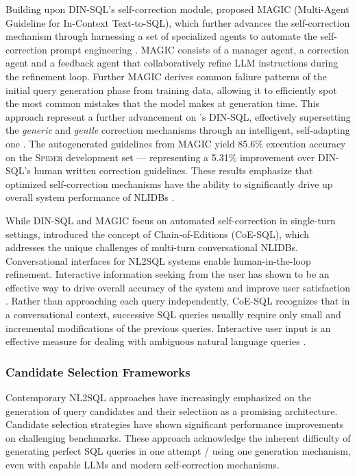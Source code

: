 \documentclass{article}
\begin{document}
Building upon DIN-SQL's self-correction module, \cite{MAGIC} proposed MAGIC (Multi-Agent Guideline for In-Context Text-to-SQL),
which further advances the self-correction mechanism through harnessing a set of specialized agents to automate the self-correction
prompt engineering \citep{MAGIC}. MAGIC consists of a manager agent, a correction agent and a feedback agent that collaboratively
refine LLM instructions during the refinement loop. Further MAGIC derives common faliure patterns of the initial query generation
phase from training data, allowing it to efficiently spot the most common mistakes that the model makes at generation time. This
approach represent a further advancement on \citeauthor{DINSQL}'s DIN-SQL, effectively supersetting the \textit{generic} and
\textit{gentle} correction mechanisms through an intelligent, self-adapting one \citep{MAGIC}. The autogenerated guidelines from
MAGIC yield 85.6\% execution accuracy on the \textsc{Spider} development set — representing a 5.31\% improvement over DIN-SQL's
human written correction guidelines. These results emphasize that optimized self-correction mechanisms have the ability to
significantly drive up overall system performance of NLIDBs \citep{MAGIC}.

While DIN-SQL and MAGIC focus on automated self-correction in single-turn settings, \cite{CoE-SQL} introduced the concept of
Chain-of-Editions (CoE-SQL), which addresses the unique challenges of multi-turn conversational NLIDBs. Conversational interfaces
for NL2SQL systems enable human-in-the-loop refinement. Interactive information seeking from the user has shown to be an
effective way to drive overall accuracy of the system and improve user satisfaction \citep{NALIR}. Rather than approaching
each query independently, CoE-SQL recognizes that in a conversational context, successive SQL queries usuallly require only
small and incremental modifications of the previous queries. Interactive user input is an effective measure for dealing with
ambiguous natural language queries \citep{CoE-SQL, UnnaturalQueryLanguage, NALIR}.

\subsubsection{Candidate Selection Frameworks}

Contemporary NL2SQL approaches have increasingly emphasized on the generation of query candidates and their selectiion as a
promising architecture. Candidate selection strategies have shown significant performance improvements on challenging benchmarks.
These approach acknowledge the inherent difficulty of generating perfect SQL queries in one attempt / using one generation mechanism,
even with capable LLMs and modern self-correction mechanisms.
\end{document}
